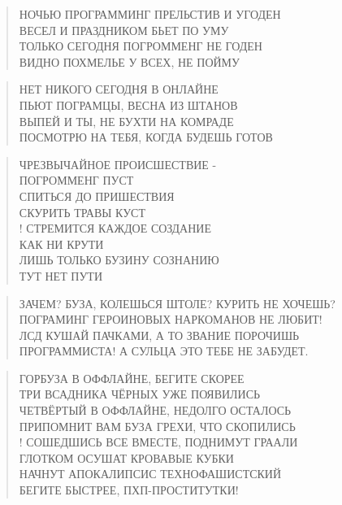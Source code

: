 \poemtitle{***}
\begin{verse}
НОЧЬЮ ПРОГРАММИНГ ПРЕЛЬСТИВ И УГОДЕН\\
ВЕСЕЛ И ПРАЗДНИКОМ БЬЕТ ПО УМУ\\
ТОЛЬКО СЕГОДНЯ ПОГРОММЕНГ НЕ ГОДЕН\\
ВИДНО ПОХМЕЛЬЕ У ВСЕХ, НЕ ПОЙМУ
\end{verse}

\poemtitle{***}
\begin{verse}
НЕТ НИКОГО СЕГОДНЯ В ОНЛАЙНЕ\\
ПЬЮТ ПОГРАМЦЫ, ВЕСНА ИЗ ШТАНОВ\\
ВЫПЕЙ И ТЫ, НЕ БУХТИ НА КОМРАДЕ\\
ПОСМОТРЮ НА ТЕБЯ, КОГДА БУДЕШЬ ГОТОВ
\end{verse}

\poemtitle{***}
\begin{verse}
ЧРЕЗВЫЧАЙНОЕ ПРОИСШЕСТВИЕ -\\
                     ПОГРОММЕНГ ПУСТ\\
СПИТЬСЯ ДО ПРИШЕСТВИЯ\\
                     СКУРИТЬ ТРАВЫ КУСТ\\!
СТРЕМИТСЯ КАЖДОЕ СОЗДАНИЕ\\
                     КАК НИ КРУТИ\\
ЛИШЬ ТОЛЬКО БУЗИНУ СОЗНАНИЮ\\
                     ТУТ НЕТ ПУТИ
\end{verse}

\poemtitle{***}
\begin{verse}
ЗАЧЕМ? БУЗА, КОЛЕШЬСЯ ШТОЛЕ? КУРИТЬ НЕ ХОЧЕШЬ?\\
ПОГРАМИНГ ГЕРОИНОВЫХ НАРКОМАНОВ НЕ ЛЮБИТ!\\
ЛСД КУШАЙ ПАЧКАМИ, А ТО ЗВАНИЕ ПОРОЧИШЬ\\
ПРОГРАММИСТА! А СУЛЬЦА ЭТО ТЕБЕ НЕ ЗАБУДЕТ.
\end{verse}

\poemtitle{***}
\begin{verse}
ГОРБУЗА В ОФФЛАЙНЕ, БЕГИТЕ СКОРЕЕ\\
ТРИ ВСАДНИКА ЧЁРНЫХ УЖЕ ПОЯВИЛИСЬ\\
ЧЕТВЁРТЫЙ В ОФФЛАЙНЕ, НЕДОЛГО ОСТАЛОСЬ\\
ПРИПОМНИТ ВАМ БУЗА ГРЕХИ, ЧТО СКОПИЛИСЬ\\!
СОШЕДШИСЬ ВСЕ ВМЕСТЕ, ПОДНИМУТ ГРААЛИ\\
ГЛОТКОМ ОСУШАТ КРОВАВЫЕ КУБКИ\\
НАЧНУТ АПОКАЛИПСИС ТЕХНОФАШИСТСКИЙ\\
БЕГИТЕ БЫСТРЕЕ, ПХП-ПРОСТИТУТКИ!
\end{verse}

